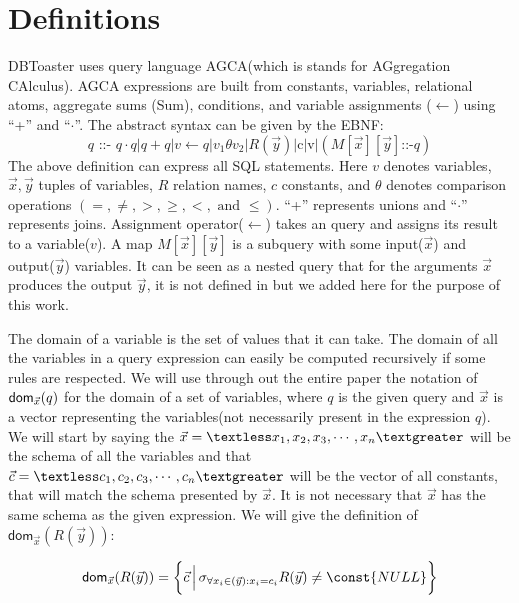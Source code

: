 \documentclass[12pt]{article}
\newcommand{\dom}{\textsf{dom}}
\begin{document}
\section{Definitions}\label{defin}
DBToaster uses query language AGCA(which is stands for AGgregation CAlculus). 
AGCA expressions are built from constants, variables, relational atoms, aggregate sums (Sum), conditions, and variable assignments ($\gets$) using ``+''  and ``$\cdot$''. The abstract syntax can be given by the EBNF:
\begin{equation}
\label{def:agca}
q\text{ ::- }q\cdot q | q + q|v \gets q |v_{1}\theta v_{2}|R(\vec{y})|\text{c}|\text{v}|(M[\vec{x}][\vec{y}]\text{::-}q)
\end{equation}
The above definition can express all SQL statements. Here $v$ denotes variables, $\vec{x},\vec{y}$ tuples of variables, $R$ relation names, $c$ constants, and $\theta$ denotes comparison operations $(=,\neq, >, \geq, <, \text{ and }\leq)$.
 ``+'' represents unions and ``$\cdot$'' represents joins. Assignment operator($\gets$) takes an query and assigns its result to a variable($v$). A map $M[\vec{x}][\vec{y}]$ is a subquery with some input($\vec{x}$) and output($\vec{y}$) variables. It can be seen as a nested query that for the arguments $\vec{x}$ produces the output $\vec{y}$, it is not defined in \cite{1} but we added here for the purpose of this work.

The domain of a variable is the set of values that it can take. The domain of all the variables in a query expression can easily be computed recursively if some rules are respected. We will use through out the entire paper the notation of $\text{\dom{}}_{\vec x}(q)$ for the domain of a set of variables, where $q$ is the given query and $\vec x$ is a vector representing the variables(not necessarily present in the expression $q$). We will start by saying the $\vec x=\textless x_1,x_2,x_3,\cdots,x_n\textgreater$ will be the schema of all the variables 
and that $\vec c=\textless c_1,c_2,c_3,\cdots,c_n\textgreater$ will be the vector of all constants, that will match the schema presented by $\vec x$. It is not necessary that $\vec{x}$  has the same schema as the given expression. We will give the definition of $\dom{}_{\vec x}(R(\vec y))$:

\begin{equation}
\label{def:relation}
\dom{}_{\vec x}(R(\vec y))=\bigg\{\vec c\,\Big|\,\sigma_{\forall x_i\in(\vec{y}): x_{i}=c_{i}}R(\vec y)\not= \const{NULL}\bigg\}
\end{equation}
\end{document}
